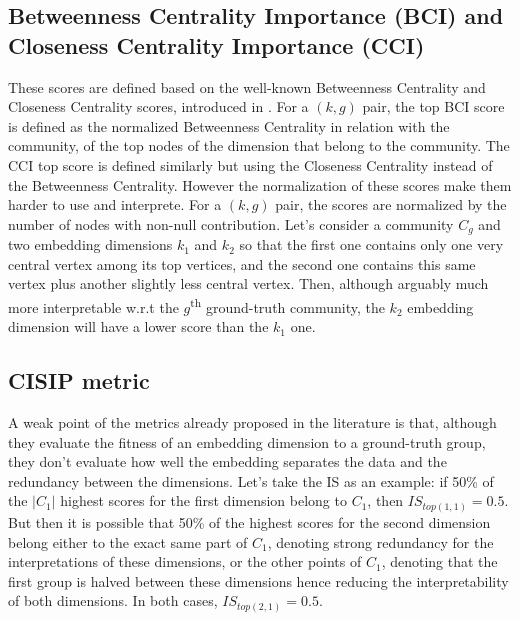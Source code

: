 \subsection{Betweenness Centrality Importance (BCI) and Closeness Centrality Importance (CCI)}\label{subsec:bci_cci_introduction}
These scores are defined based on the well-known Betweenness Centrality and Closeness Centrality scores, introduced in \cite{bloch2023centrality}. %
For a $(k, g)$ pair, the top BCI score is defined as the normalized Betweenness Centrality in relation with the community, of the top nodes of the dimension that belong to the community. The CCI top score is defined similarly but using the Closeness Centrality instead of the Betweenness Centrality.
However the normalization of these scores make them harder to use and interprete. For a $(k, g)$ pair, the scores are normalized by the number of nodes with non-null contribution. Let's consider a community $C_g$ and two embedding dimensions $k_1$ and $k_2$ so that the first one contains only one very central vertex among its top vertices, and the second one contains this same vertex plus another slightly less central vertex. Then, although arguably much more interpretable w.r.t the $g$\textsuperscript{th} ground-truth community, the $k_2$ embedding dimension will have a lower score than the $k_1$ one.

\subsection{CISIP metric}

A weak point of the metrics already proposed in the literature is that, although they evaluate the fitness of an embedding dimension to a ground-truth group, they don't evaluate how well the embedding separates the data and the redundancy between the dimensions. Let's take the IS as an example: if 50\% of the $|C_1|$ highest scores for the first dimension belong to $C_1$, then $IS_{top(1,1)} = 0.5$. But then it is possible that 50\% of the highest scores for the second dimension belong either to the exact same part of $C_1$, denoting strong redundancy for the interpretations of these dimensions, or the other points of $C_1$, denoting that the first group is halved between these dimensions hence reducing the interpretability of both dimensions. In both cases, $IS_{top(2, 1)} = 0.5$.

